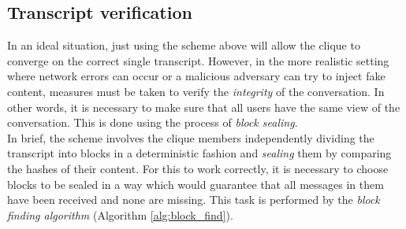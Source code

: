 \documentclass[a4paper, 12pt]{report}
\begin{document}
\subsection{Transcript verification}
\label{subsec:prep.sealing}
In an ideal situation, just using the scheme above will allow the clique to converge on the correct single transcript. However, in the more realistic setting where network errors can occur or a malicious adversary can try to inject fake content, measures must be taken to verify the \emph{integrity} of the conversation. In other words, it is necessary to make sure that all users have the same view of the conversation. This is done using the process of \emph{block sealing}. \\

In brief, the scheme involves the clique members independently dividing the transcript into blocks in a deterministic fashion and \emph{sealing} them by comparing the hashes of their content. For this to work correctly, it is necessary to choose blocks to be sealed in a way which would guarantee that all messages in them have been received and none are missing. This task is performed by the \emph{block finding algorithm} (Algorithm \ref{alg:block_find}). \\
\end{document}
